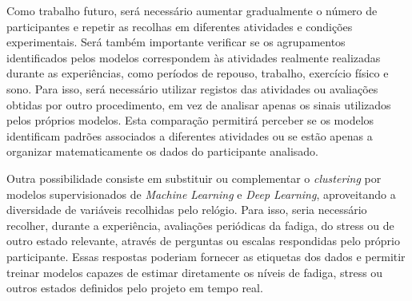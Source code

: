 Como trabalho futuro, será necessário aumentar gradualmente o número de participantes e repetir as recolhas em diferentes atividades e condições experimentais. Será também importante verificar se os agrupamentos identificados pelos modelos correspondem às atividades realmente realizadas durante as experiências, como períodos de repouso, trabalho, exercício físico e sono. Para isso, será necessário utilizar registos das atividades ou avaliações obtidas por outro procedimento, em vez de analisar apenas os sinais utilizados pelos próprios modelos. Esta comparação permitirá perceber se os modelos identificam padrões associados a diferentes atividades ou se estão apenas a organizar matematicamente os dados do participante analisado.

Outra possibilidade consiste em substituir ou complementar o \textit{clustering} por modelos supervisionados de \textit{Machine Learning} e \textit{Deep Learning}, aproveitando a diversidade de variáveis recolhidas pelo relógio. Para isso, seria necessário recolher, durante a experiência, avaliações periódicas da fadiga, do stress ou de outro estado relevante, através de perguntas ou escalas respondidas pelo próprio participante. Essas respostas poderiam fornecer as etiquetas dos dados e permitir treinar modelos capazes de estimar diretamente os níveis de fadiga, stress ou outros estados definidos pelo projeto em tempo real.


